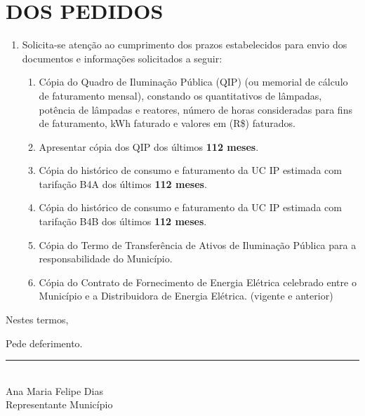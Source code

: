 \documentclass[12pt,a4paper]{article}
\begin{document}
\section{DOS PEDIDOS}
\begin{enumerate}[resume]
  \item Solicita-se atenção ao cumprimento dos prazos estabelecidos para envio dos documentos e informações solicitados a seguir:
  \begin{enumerate}
    \item Cópia do Quadro de Iluminação Pública (QIP) (ou memorial de cálculo de faturamento mensal), constando os quantitativos de lâmpadas, potência de lâmpadas e reatores, número de horas consideradas para fins de faturamento, kWh faturado e valores em (R\$) faturados.
    \item Apresentar cópia dos QIP dos últimos \textbf{112 meses}.
    \item Cópia do histórico de consumo e faturamento da UC IP estimada com tarifação B4A dos últimos \textbf{112 meses}.
    \item Cópia do histórico de consumo e faturamento da UC IP estimada com tarifação B4B dos últimos \textbf{112 meses}.
    \item Cópia do Termo de Transferência de Ativos de Iluminação Pública para a responsabilidade do Município.
    \item Cópia do Contrato de Fornecimento de Energia Elétrica celebrado entre o Município e a Distribuidora de Energia Elétrica. (vigente e anterior)
  \end{enumerate}\end{enumerate}

Nestes termos,

Pede deferimento.

\centering
\begin{minipage}{0.45\textwidth}
\vspace{2cm}
\centering
\rule{\linewidth}{0.4pt}\\
Ana Maria Felipe Dias\\
{\small Representante Município}
\end{minipage}
\end{document}
